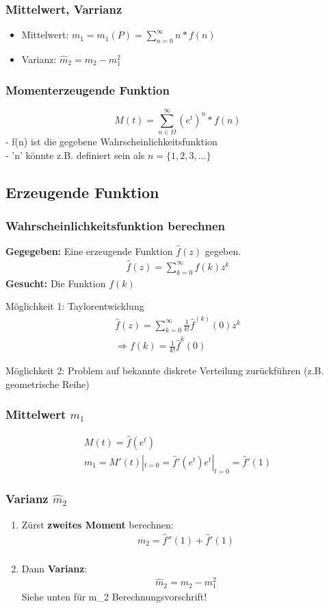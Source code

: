 \documentclass{article}
\begin{document}
\subsubsection{Mittelwert, Varrianz}
\begin{itemize}
	\item Mittelwert: $m_1 = m_1(P) = \sum_{n=0}^\infty n*f(n)$
	\item Varianz: $\widehat{m}_2 = m_2 - m_1^2$
\end{itemize}
\subsubsection{Momenterzeugende Funktion}
\[
	M(t)=\sum_{n\in\Omega}^{\infty}(e^t)^n * f(n)
\]
- f(n) ist die gegebene Wahrscheinlichkeitsfunktion\\
- 'n' k\"onnte z.B. definiert sein als $n=\{1,2,3,...\}$
\subsection{Erzeugende Funktion}
\subsubsection{Wahrscheinlichkeitsfunktion berechnen}
\textbf{Gegegeben:} Eine erzeugende Funktion $\hat{f}(z)$ gegeben.
\begin{align}
	\hat{f}(z) = \sum^{\infty}_{k=0} f(k)z^k
\end{align}
\textbf{Gesucht:} Die Funktion $f(k)$

M\"oglichkeit 1: Taylorentwicklung
\begin{align}
	\hat{f}(z) = \sum_{k=0}^{\infty} \frac{1}{k!}\hat{f}^{(k)}(0)z^k\\
	\Rightarrow f(k) = \frac{1}{k!} \hat{f}^{k}(0)
\end{align}

M\"oglichkeit 2: Problem auf bekannte diskrete Verteilung zur\"uckf\"uhren (z.B. geometrische
Reihe)
\subsubsection{Mittelwert $m_1$}
\begin{align}
	M(t) = \hat{f}(e^t)\\
	m_1  = M'(t)|_{t=0} = \hat{f}'(e^t)e^t|_{t=0} = \hat{f}'(1)
\end{align}
\subsubsection{Varianz $\hat{m}_2$}
\begin{enumerate}
	\item Z\"urst \textbf{zweites Moment} berechnen:
		\begin{align}
			m_2 = \hat{f}''(1) + \hat{f}'(1)\\
		\end{align}
	\item Dann \textbf{Varianz}:
		\begin{align}
			\hat{m}_2 = m_2 - m_1^2
		\end{align}
		Siehe unten f\"ur m_2 Berechnungsvorschrift!
\end{enumerate}
\end{document}
